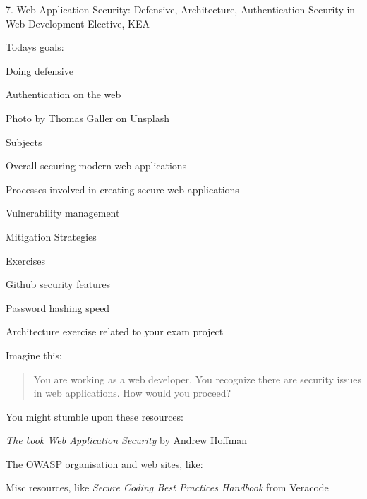 \documentclass[Screen16to9,17pt]{foils}
\begin{document}
\mytitlepage
{7. Web Application Security: Defensive, Architecture, Authentication}
{Security in Web Development Elective, KEA}




Todays goals:
\begin{list2}
\item Doing defensive
\item Authentication on the web
\end{list2}

Photo by Thomas Galler on Unsplash




\begin{list1}
\item Subjects
\begin{list2}
\item Overall securing modern web applications
\item Processes involved in creating secure web applications
\item Vulnerability management
\item Mitigation Strategies
\end{list2}
\item Exercises
\begin{list2}
\item Github security features
\item Password hashing speed
\item Architecture exercise related to your exam project
\end{list2}
\end{list1}




Imagine this:
\begin{quote}
You are working as a web developer. You recognize there are security issues in web applications. How would you proceed?
\end{quote}

You might stumble upon these resources:
\begin{list2}
\item \emph{The book Web Application Security} by Andrew Hoffman
\item The OWASP organisation and web sites, like:\\
\item Misc resources, like \emph{Secure Coding Best Practices Handbook} from Veracode
\end{list2}
\end{document}
